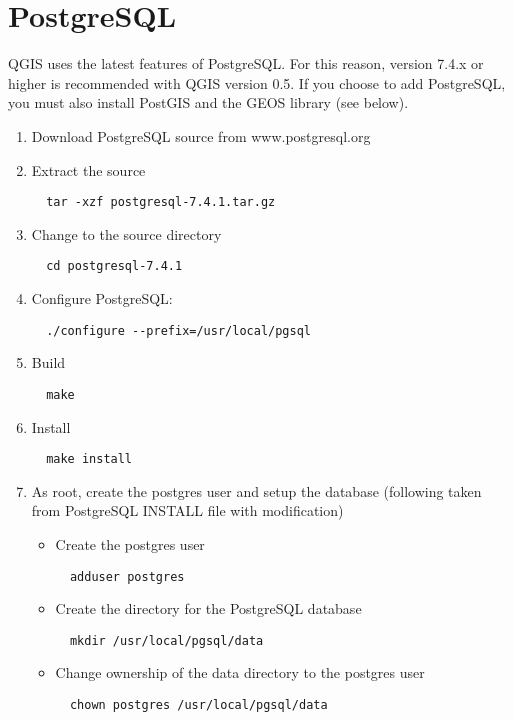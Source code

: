   \section{PostgreSQL}
  QGIS uses the latest features of PostgreSQL. For this reason, version 7.4.x or higher is recommended with QGIS version 0.5. If you choose to add PostgreSQL, you must also install PostGIS and the GEOS library (see below). 
  \begin{enumerate}
  \item Download PostgreSQL source from www.postgresql.org 
  \item Extract the source 
  \begin{verbatim}
  tar -xzf postgresql-7.4.1.tar.gz
  \end{verbatim}

  \item Change to the source directory 
  \begin{verbatim}
  cd postgresql-7.4.1
  \end{verbatim}

  \item Configure PostgreSQL:
  \begin{verbatim}
  ./configure --prefix=/usr/local/pgsql 
  \end{verbatim}

  \item Build
  \begin{verbatim}
  make
  \end{verbatim}

  \item Install
  \begin{verbatim}
  make install
  \end{verbatim}

\item As root, create the postgres user and setup the database (following taken from PostgreSQL INSTALL file with modification)
  \begin{itemize} 
  \item Create the postgres user 
  \begin{verbatim}
  adduser postgres
  \end{verbatim}

  \item Create the directory for the PostgreSQL database 
  \begin{verbatim}
  mkdir /usr/local/pgsql/data
  \end{verbatim}

  \item Change ownership of the data directory to the postgres user
  \begin{verbatim}
  chown postgres /usr/local/pgsql/data
  \end{verbatim}


\end{itemize}
\end{enumerate}
